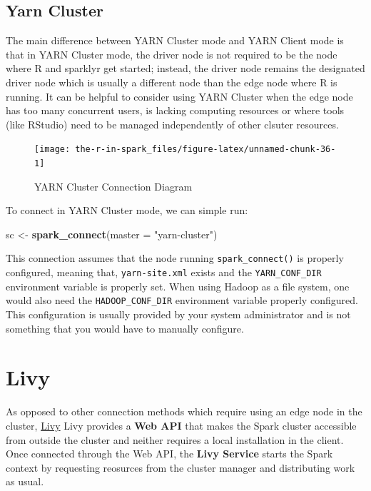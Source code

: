 \documentclass[]{book}
\newenvironment{Shaded}{\begin{snugshade}}{\end{snugshade}}
\newcommand{\DataTypeTok}[1]{\textcolor[rgb]{0.13,0.29,0.53}{#1}}
\newcommand{\KeywordTok}[1]{\textcolor[rgb]{0.13,0.29,0.53}{\textbf{#1}}}
\newcommand{\NormalTok}[1]{#1}
\newcommand{\StringTok}[1]{\textcolor[rgb]{0.31,0.60,0.02}{#1}}
\theoremstyle{definition}
\theoremstyle{definition}
\theoremstyle{definition}
\theoremstyle{remark}
\begin{document}
\hypertarget{yarn-cluster}{%
\subsection{Yarn Cluster}\label{yarn-cluster}}

The main difference between YARN Cluster mode and YARN Client mode is
that in YARN Cluster mode, the driver node is not required to be the
node where R and sparklyr get started; instead, the driver node remains
the designated driver node which is usually a different node than the
edge node where R is running. It can be helpful to consider using YARN
Cluster when the edge node has too many concurrent users, is lacking
computing resources or where tools (like RStudio) need to be managed
independently of other clsuter resources.

\begin{figure}

{\centering \texttt{[image: the-r-in-spark\_files/figure-latex/unnamed-chunk-36-1]} 

}

\caption{YARN Cluster Connection Diagram}\label{fig:unnamed-chunk-36}
\end{figure}

To connect in YARN Cluster mode, we can simple run:

\begin{Shaded}
\begin{Highlighting}[]
\NormalTok{sc <-}\StringTok{ }\KeywordTok{spark_connect}\NormalTok{(}\DataTypeTok{master =} \StringTok{"yarn-cluster"}\NormalTok{)}
\end{Highlighting}
\end{Shaded}

This connection assumes that the node running \texttt{spark\_connect()}
is properly configured, meaning that, \texttt{yarn-site.xml} exists and
the \texttt{YARN\_CONF\_DIR} environment variable is properly set. When
using Hadoop as a file system, one would also need the
\texttt{HADOOP\_CONF\_DIR} environment variable properly configured.
This configuration is usually provided by your system administrator and
is not something that you would have to manually configure.

\hypertarget{livy}{%
\section{Livy}\label{livy}}

As opposed to other connection methods which require using an edge node
in the cluster, \href{clusters-livy}{Livy} Livy provides a \textbf{Web
API} that makes the Spark cluster accessible from outside the cluster
and neither requires a local installation in the client. Once connected
through the Web API, the \textbf{Livy Service} starts the Spark context
by requesting reosurces from the cluster manager and distributing work
as usual.
\end{document}
